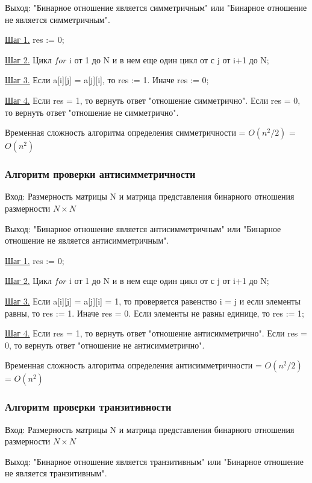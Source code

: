 \documentclass[bachelor, och, labwork]{shiza}
\begin{document}
	$\textit{Выход:}$ "Бинарное отношение является симметричным" или "Бинарное отношение не является симметричным".
	
	\underline{Шаг 1.} res := 0;
	
	\underline{Шаг 2.} Цикл $for$ i от 1 до N и в нем еще один цикл от с j от i+1 до N;
	
	\underline{Шаг 3.} Если a[i][j] = a[j][i], то res := 1. Иначе res := 0;
	
	\underline{Шаг 4.} Если res = 1, то вернуть ответ "отношение симметрично". Если res = 0, то вернуть ответ "отношение не симметрично".
	
	Временная сложность алгоритма определения симметричности = $O(n^2/2)$ = $O(n^2)$
	
	\subsubsection{Алгоритм проверки антисимметричности}
	
	$\textit{Вход:}$ Размерность матрицы N и матрица представления бинарного отношения размерности $N \times N$
	
	$\textit{Выход:}$  "Бинарное отношение является антисимметричным" или "Бинарное отношение не является антисимметричным".
	
	\underline{Шаг 1.} res := 0;

	\underline{Шаг 2.} Цикл $for$ i от 1 до N и в нем еще один цикл от с j от i+1 до N;
	
	\underline{Шаг 3.} Если  a[i][j] = a[j][i] = 1, то проверяется равенство i = j и если элементы равны, то res := 1. Иначе res = 0. Если элементы не равны единице, то res := 1;
	
	\underline{Шаг 4.} Если res = 1, то вернуть ответ "отношение антисимметрично". Если res = 0, то вернуть ответ "отношение не антисимметрично".
	
	Временная сложность алгоритма определения антисимметричности = $O(n^2/2)$ = $O(n^2)$
	
	\subsubsection{Алгоритм проверки транзитивности}

	$\textit{Вход:}$ Размерность матрицы N и матрица представления бинарного отношения размерности $N \times N$
	
	$\textit{Выход:}$  "Бинарное отношение является транзитивным" или "Бинарное отношение не является транзитивным".
	
\end{document}
